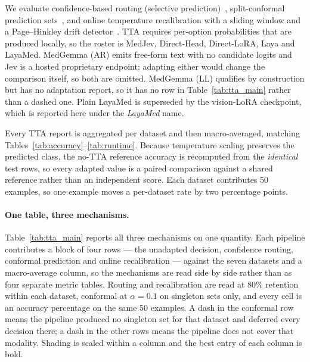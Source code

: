 We evaluate confidence-based routing (selective prediction)~\cite{geifman2017selective}, split-conformal prediction sets~\cite{angelopoulos2023conformal}, and online temperature recalibration with a sliding window and a Page--Hinkley drift detector~\cite{page1954continuous}. TTA requires per-option probabilities that are produced locally, so the roster is MedJev, Direct-Head, Direct-LoRA, Laya and LayaMed. MedGemma (AR) emits free-form text with no candidate logits and Jev is a hosted proprietary endpoint; adapting either would change the comparison itself, so both are omitted. MedGemma (LL) qualifies by construction but has no adaptation report, so it has no row in Table~\ref{tab:tta_main} rather than a dashed one. Plain LayaMed is superseded by the vision-LoRA checkpoint, which is reported here under the \emph{LayaMed} name.

Every TTA report is aggregated per dataset and then macro-averaged, matching Tables~\ref{tab:accuracy}--\ref{tab:runtime}. Because temperature scaling preserves the predicted class, the no-TTA reference accuracy is recomputed from the \emph{identical} test rows, so every adapted value is a paired comparison against a shared reference rather than an independent score. Each dataset contributes 50 examples, so one example moves a per-dataset rate by two percentage points.

\paragraph{One table, three mechanisms.}
Table~\ref{tab:tta_main} reports all three mechanisms on one quantity. Each pipeline contributes a block of four rows --- the unadapted decision, confidence routing, conformal prediction and online recalibration --- against the seven datasets and a macro-average column, so the mechanisms are read side by side rather than as four separate metric tables. Routing and recalibration are read at 80\% retention within each dataset, conformal at $\alpha=0.1$ on singleton sets only, and every cell is an accuracy percentage on the same 50 examples. A dash in the conformal row means the pipeline produced no singleton set for that dataset and deferred every decision there; a dash in the other rows means the pipeline does not cover that modality. Shading is scaled within a column and the best entry of each column is bold.

